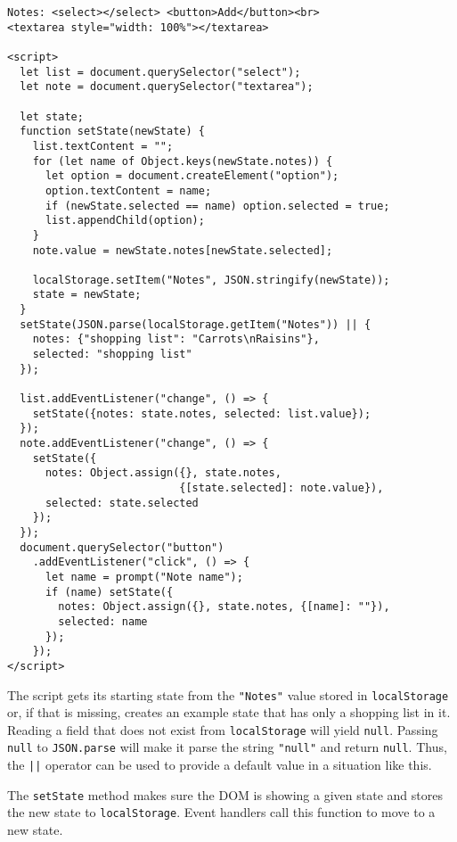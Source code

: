 \begin{lstlisting}
Notes: <select></select> <button>Add</button><br>
<textarea style="width: 100%"></textarea>

<script>
  let list = document.querySelector("select");
  let note = document.querySelector("textarea");

  let state;
  function setState(newState) {
    list.textContent = "";
    for (let name of Object.keys(newState.notes)) {
      let option = document.createElement("option");
      option.textContent = name;
      if (newState.selected == name) option.selected = true;
      list.appendChild(option);
    }
    note.value = newState.notes[newState.selected];

    localStorage.setItem("Notes", JSON.stringify(newState));
    state = newState;
  }
  setState(JSON.parse(localStorage.getItem("Notes")) || {
    notes: {"shopping list": "Carrots\nRaisins"},
    selected: "shopping list"
  });

  list.addEventListener("change", () => {
    setState({notes: state.notes, selected: list.value});
  });
  note.addEventListener("change", () => {
    setState({
      notes: Object.assign({}, state.notes,
                           {[state.selected]: note.value}),
      selected: state.selected
    });
  });
  document.querySelector("button")
    .addEventListener("click", () => {
      let name = prompt("Note name");
      if (name) setState({
        notes: Object.assign({}, state.notes, {[name]: ""}),
        selected: name
      });
    });
</script>
\end{lstlisting}
\noindent{}

The script gets its starting state from the \lstinline`"Notes"` value stored in \lstinline`localStorage` or, if that is missing, creates an example state that has only a shopping list in it. Reading a field that does not exist from \lstinline`localStorage` will yield \lstinline`null`. Passing \lstinline`null` to \lstinline`JSON.parse` will make it parse the string \lstinline`"null"` and return \lstinline`null`. Thus, the \lstinline`||` operator can be used to provide a default value in a situation like this.

The \lstinline`setState` method makes sure the DOM is showing a given state and stores the new state to \lstinline`localStorage`. Event handlers call this function to move to a new state.

